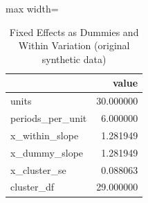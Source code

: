 \begin{table}[htbp]
\centering
\caption{Fixed Effects as Dummies and Within Variation (original synthetic data)}
\begingroup
\small
\setlength{\tabcolsep}{6pt}
\renewcommand{\arraystretch}{1.12}
\begin{adjustbox}{max width=\linewidth}
\begin{tabular}{@{}lr@{}}
\toprule
 & value \\
\midrule
units & 30.000000 \\
periods\_per\_unit & 6.000000 \\
x\_within\_slope & 1.281949 \\
x\_dummy\_slope & 1.281949 \\
x\_cluster\_se & 0.088063 \\
cluster\_df & 29.000000 \\
\bottomrule
\end{tabular}
\end{adjustbox}
\endgroup
\end{table}